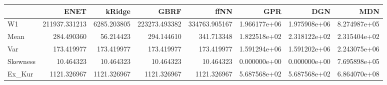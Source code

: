 \begin{tabular}{lrrrrrrr}
\toprule
{} &           ENET &       kRidge &           GBRF &           ffNN &           GPR &           DGN &           MDN \\
\midrule
W1       &  211937.331213 &  6285.203805 &  223273.493382 &  334763.905167 &  1.966177e+06 &  1.975908e+06 &  8.274987e+05 \\
Mean     &     284.490360 &    56.214423 &     294.144610 &     341.713348 &  1.822518e+02 &  2.318122e+02 &  2.315404e+02 \\
Var      &     173.419977 &   173.419977 &     173.419977 &     173.419977 &  1.591294e+06 &  1.591202e+06 &  2.243075e+06 \\
Skewness &      10.464323 &    10.464323 &      10.464323 &      10.464323 &  0.000000e+00 &  0.000000e+00 &  7.695898e+05 \\
Ex\_Kur   &    1121.326967 &  1121.326967 &    1121.326967 &    1121.326967 &  5.687568e+02 &  5.687568e+02 &  6.864070e+08 \\
\bottomrule
\end{tabular}
